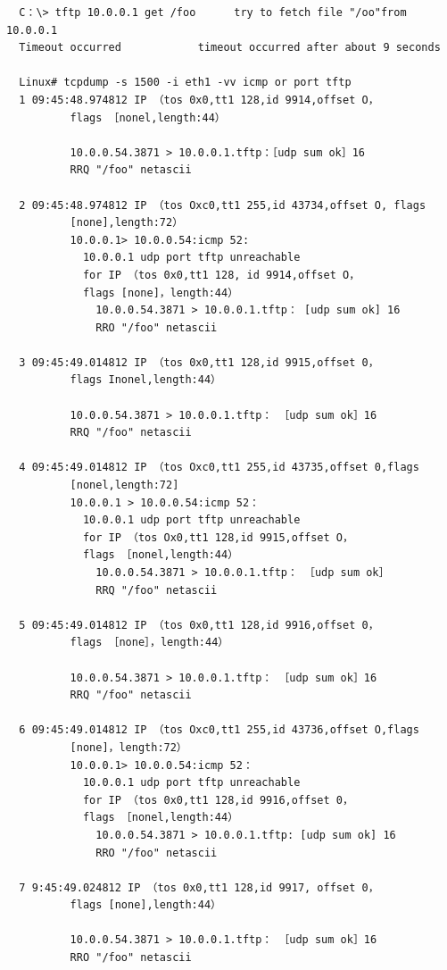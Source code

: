 \begin{verbatim}
  C：\> tftp 10.0.0.1 get /foo      try to fetch file "/oo"from 10.0.0.1
  Timeout occurred            timeout occurred after about 9 seconds

  Linux# tcpdump -s 1500 -i eth1 -vv icmp or port tftp
  1 09:45:48.974812 IP （tos 0x0,tt1 128,id 9914,offset O，
          flags ［nonel,length:44）

          10.0.0.54.3871 > 10.0.0.1.tftp：［udp sum ok］16
          RRQ "/foo" netascii

  2 09:45:48.974812 IP （tos Oxc0,tt1 255,id 43734,offset O, flags
          [none],length:72）
          10.0.0.1> 10.0.0.54:icmp 52:
            10.0.0.1 udp port tftp unreachable
            for IP （tos 0x0,tt1 128, id 9914,offset O，
            flags [none]，length:44）
              10.0.0.54.3871 > 10.0.0.1.tftp： [udp sum ok] 16
              RRO "/foo" netascii

  3 09:45:49.014812 IP （tos 0x0,tt1 128,id 9915,offset 0，
          flags Inonel,length:44）

          10.0.0.54.3871 > 10.0.0.1.tftp： ［udp sum ok］16
          RRQ "/foo" netascii

  4 09:45:49.014812 IP （tos Oxc0,tt1 255,id 43735,offset 0,flags
          [nonel,length:72]
          10.0.0.1 > 10.0.0.54:icmp 52：
            10.0.0.1 udp port tftp unreachable
            for IP （tos Ox0,tt1 128,id 9915,offset O，
            flags ［nonel,length:44）
              10.0.0.54.3871 > 10.0.0.1.tftp： ［udp sum ok］
              RRQ "/foo" netascii

  5 09:45:49.014812 IP （tos 0x0,tt1 128,id 9916,offset 0，
          flags ［none］，length:44）

          10.0.0.54.3871 > 10.0.0.1.tftp： ［udp sum ok］16
          RRQ "/foo" netascii

  6 09:45:49.014812 IP （tos Oxc0,tt1 255,id 43736,offset O,flags
          [none]，length:72）
          10.0.0.1> 10.0.0.54:icmp 52：
            10.0.0.1 udp port tftp unreachable
            for IP （tos 0x0,tt1 128,id 9916,offset 0，
            flags ［nonel,length:44）
              10.0.0.54.3871 > 10.0.0.1.tftp: [udp sum ok] 16
              RRO "/foo" netascii

  7 9:45:49.024812 IP （tos 0x0,tt1 128,id 9917, offset 0，
          flags [none],length:44）

          10.0.0.54.3871 > 10.0.0.1.tftp： ［udp sum ok］16
          RRO "/foo" netascii


\end{verbatim}
